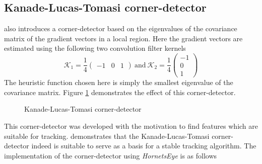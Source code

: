 \documentclass[a4paper,12pt]{book}
\begin{document}
\subsection{Kanade-Lucas-Tomasi corner-detector}
\cite{RefWorks:355} also introduces a corner-detector based on the
eigenvalues of the covariance matrix of the gradient vectors in a local
region. Here the gradient vectors are estimated using the following two
convolution filter kernels
\begin{equation*}
  \mathcal{K}_1=\displaystyle\frac{1}{4}
  \begin{pmatrix} -1 & 0 & 1 \end{pmatrix}
  \mathrm{\ and\ }
  \mathcal{K}_2=\displaystyle\frac{1}{4}
  \begin{pmatrix} -1 \\ 0 \\ 1\end{pmatrix}
\end{equation*}
The heuristic function chosen here is simply the smallest eigenvalue of
the covariance matrix. Figure \ref{fig:klt} demonstrates the effect of
this corner-detector.
\begin{figure}[htbp]
   \begin{center}
     \begin{minipage}[c]{.45\textwidth}
     \end{minipage}
     \begin{minipage}[c]{.45\textwidth}
       \resizebox{\textwidth}{!}{\texttt{[image: s\_t]}}
     \end{minipage}
     \caption{Kanade-Lucas-Tomasi corner-detector\label{fig:klt}}
   \end{center} %
\end{figure}
This corner-detector was developed with the motivation to find features
which are suitable for tracking. \cite{RefWorks:354} demonstrates that
the Kanade-Lucas-Tomasi corner-detector indeed is suitable to serve as a
basis for a stable tracking algorithm.
The implementation of the corner-detector using \emph{HornetsEye} is as
follows
\begin{scriptsize}
  
\end{scriptsize}
\end{document}
